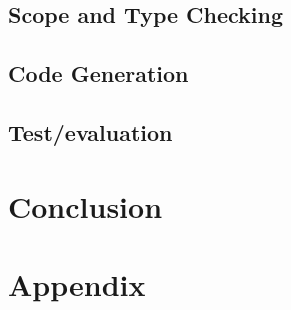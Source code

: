 	\section{Scope and Type Checking}
	\section{Code Generation}

\renewcommand{\ind}[1]{}
\section{Test/evaluation}

\renewcommand{\ind}[1]{}
\chapter{Conclusion}



\begingroup
	\raggedright
	{}	%
\endgroup


\newpage
\listoffixmes	%

\clearforchapter
\chapter{Appendix}
\appendix	%


\renewcommand{\ind}[1]{}

